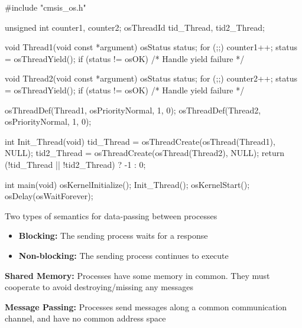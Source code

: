 \documentclass[a4paper,11pt]{article}
\begin{document}
\begin{minipage}{\linewidth}
\begin{notecode}[language=C,basicstyle=\fontsize{9.5}{11}\selectfont\ttfamily\color{NoteInk}]
#include "cmsis_os.h"

unsigned int counter1, counter2;
osThreadId tid_Thread, tid2_Thread;

void Thread1(void const *argument) {
    osStatus status;
    for (;;) {
        counter1++;
        status = osThreadYield();
        if (status != osOK) { /* Handle yield failure */ }
    }
}

void Thread2(void const *argument) {
    osStatus status;
    for (;;) {
        counter2++;
        status = osThreadYield();
        if (status != osOK) { /* Handle yield failure */ }
    }
}

osThreadDef(Thread1, osPriorityNormal, 1, 0);
osThreadDef(Thread2, osPriorityNormal, 1, 0);

int Init_Thread(void) {
    tid_Thread  = osThreadCreate(osThread(Thread1), NULL);
    tid2_Thread = osThreadCreate(osThread(Thread2), NULL);
    return (!tid_Thread || !tid2_Thread) ? -1 : 0;
}

int main(void) {
    osKernelInitialize();
    Init_Thread();
    osKernelStart();
    osDelay(osWaitForever);
}
\end{notecode}
\end{minipage}



\Needspace{140pt}



Two types of semantics for data-passing between processes\par

\Needspace{40pt}
\begin{itemize}
\item \textbf{Blocking:} The sending process waits for a response
\item \textbf{Non-blocking:} The sending process continues to execute
\end{itemize}



\Needspace{100pt}



\textbf{Shared Memory:} Processes have some memory in common. They must cooperate to avoid destroying/missing any messages\par

\textbf{Message Passing:} Processes send messages along a common communication channel, and have no common address space\par
\end{document}
